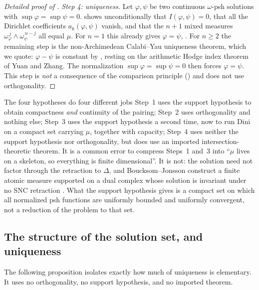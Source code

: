 \begin{proof}[Detailed proof of ]
\emph{Step 4: uniqueness.}  Let \(\varphi,\psi\) be two continuous
\(\omega\)-psh solutions with \(\sup\varphi=\sup\psi=0\).
 shows unconditionally that
\(I(\varphi,\psi)=0\), that all the Dirichlet coefficients
\(a_k(\varphi,\psi)\) vanish, and that the \(n+1\) mixed measures
\(\omega_\varphi^{\,j}\wedge\omega_\psi^{\,n-j}\) all equal \(\mu\).  For
\(n=1\) this already gives \(\varphi=\psi\),
.  For \(n\geq2\) the remaining step is the
non-Archimedean Calabi--Yau uniqueness theorem, which we quote:
\(\varphi-\psi\) is constant by \cite[Proposition~8.2]{BFJ15}, resting on
the arithmetic Hodge index theorem of Yuan and Zhang.  The normalization
\(\sup\varphi=\sup\psi=0\) then forces \(\varphi=\psi\).  This step is
\emph{not} a consequence of the comparison principle
() and does not use orthogonality.
\end{proof}

\begin{warning}{The four hypotheses do four different jobs}
Step~1 uses the support hypothesis to obtain compactness \emph{and}
continuity of the pairing; Step~2 uses orthogonality and nothing else;
Step~3 uses the support hypothesis a second time, now to run Dini on a
compact set carrying \(\mu\), together with capacity; Step~4 uses neither
the support hypothesis nor orthogonality, but does use an imported
intersection-theoretic theorem.  It is a common error to compress Steps~1
and~3 into ``\(\mu\) lives on a skeleton, so everything is finite
dimensional''.  It is not: the solution need not factor through the
retraction to \(\Delta\), and Boucksom--Jonsson construct a finite atomic
measure supported on a dual complex whose solution is invariant under no
SNC retraction \cite[Theorem~B]{BJGreen24}.  What the support hypothesis
gives is a compact set on which all normalized psh functions are uniformly
bounded and uniformly convergent, not a reduction of the problem to that
set.
\end{warning}

\subsection{The structure of the solution set, and uniqueness}
\label{sec:ch28-uniqueness}

The following proposition isolates exactly how much of uniqueness is
elementary.  It uses no orthogonality, no support hypothesis, and no
imported theorem.

